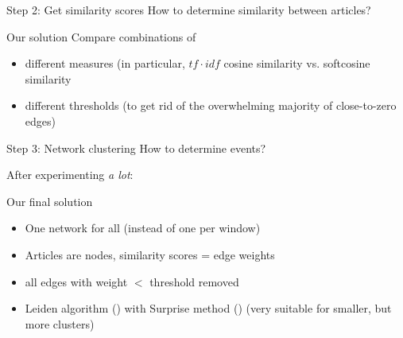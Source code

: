 \documentclass[compress]{beamer}
\begin{document}
\begin{frame}{Step 2: Get similarity scores}
	How to determine similarity between articles?
	
	
	\begin{block}{Our solution}
		Compare combinations of 
		\begin{itemize}
			\item different measures (in particular, $tf\cdot idf$ cosine similarity vs. softcosine similarity
			\item different thresholds (to get rid of the overwhelming majority of close-to-zero edges) 
		\end{itemize}
		
	\end{block}
	
\end{frame}


\begin{frame}{Step 3: Network clustering}
	How to determine events?
	
	After experimenting \emph{a lot}:
	
	\begin{block}{Our final solution}
		\begin{itemize}
			\item One network for all (instead of one per window)
			\item Articles are nodes, similarity scores = edge weights
			\item all edges with weight $<$ threshold removed
			\item Leiden algorithm (\cite{Traag2019}) with Surprise method (\cite{Traag2015}) (very suitable for smaller, but more clusters)
		\end{itemize}
	\end{block}
	
\end{frame}
\end{document}
